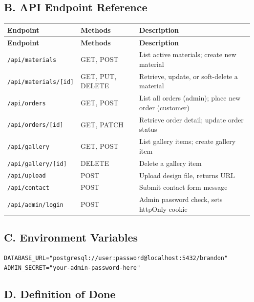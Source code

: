 \documentclass[12pt, a4paper]{article}
\begin{document}
\subsection*{B. API Endpoint Reference}

\begin{longtable}{p{4.5cm}p{2cm}p{7cm}}
\toprule
\textbf{Endpoint} & \textbf{Methods} & \textbf{Description} \\
\midrule
\endfirsthead
\toprule
\textbf{Endpoint} & \textbf{Methods} & \textbf{Description} \\
\midrule
\endhead
\bottomrule
\endlastfoot
\texttt{/api/materials}      & GET, POST           & List active materials; create new material \\
\texttt{/api/materials/[id]} & GET, PUT, DELETE    & Retrieve, update, or soft-delete a material \\
\texttt{/api/orders}         & GET, POST           & List all orders (admin); place new order (customer) \\
\texttt{/api/orders/[id]}    & GET, PATCH          & Retrieve order detail; update order status \\
\texttt{/api/gallery}        & GET, POST           & List gallery items; create gallery item \\
\texttt{/api/gallery/[id]}   & DELETE              & Delete a gallery item \\
\texttt{/api/upload}         & POST                & Upload design file, returns URL \\
\texttt{/api/contact}        & POST                & Submit contact form message \\
\texttt{/api/admin/login}    & POST                & Admin password check, sets httpOnly cookie \\
\end{longtable}

\subsection*{C. Environment Variables}

\begin{lstlisting}[caption=Required Environment Variables (.env)]
DATABASE_URL="postgresql://user:password@localhost:5432/brandon"
ADMIN_SECRET="your-admin-password-here"
\end{lstlisting}

\subsection*{D. Definition of Done}
\end{document}
